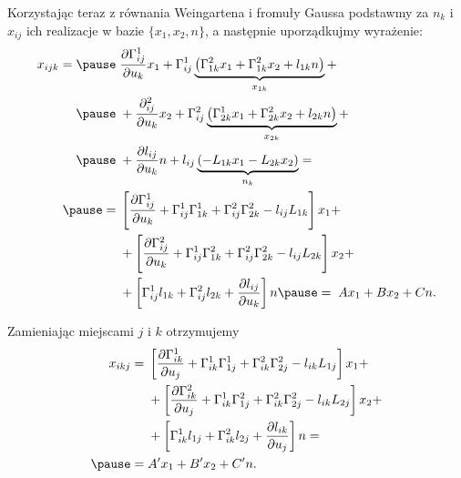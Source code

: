 \begin{frame}[<+->]

Korzystając teraz z równania Weingartena i fromuły Gaussa podstawmy za $n_k$ i $x_{ij}$ ich realizacje w bazie $\{x_1, x_2,n\}$, a następnie uporządkujmy wyrażenie:
\begin{align*}
x_{ijk}=\pause &\;\frac{\partial \Gamma^1_{ij}}{\partial u_k}x_1+ \Gamma^1_{ij}\underbrace{\left( \Gamma^2_{1k}x_1+\Gamma^2_{1k}x_2+l_{1k}n\right)}_{x_{1k}}+\\\pause
&\;+\frac{\partial^2_{ij}}{\partial u_k}x_2 +\Gamma^2_{ij}\underbrace{\left( \Gamma^1_{2k}x_1+\Gamma^2_{2k}x_2+l_{2k}n\right)}_{x_{2k}}+\\\pause
&\;+\frac{\partial l_{ij}}{\partial u_k}n+l_{ij}\underbrace{\left( -L_{1k}x_1-L_{2k}x_2\right)}_{n_k}=\\\pause
=&\;\left[\frac{\partial \Gamma^1_{ij}}{\partial u_k}+\Gamma^1_{ij}\Gamma^1_{1k}+\Gamma^2_{ij}\Gamma^2_{2k}-l_{ij}L_{1k}\right]x_1+\\
&\;+\left[ \frac{\partial \Gamma^2_{ij}}{\partial u_k}+\Gamma^1_{ij}\Gamma^2_{1k}+\Gamma^2_{ij}\Gamma^2_{2k}-l_{ij}L_{2k} \right]x_2+\\
&\;+\left[\Gamma^1_{ij}l_{1k}+\Gamma^2_{ij}l_{2k}+\frac{\partial l_{ij}}{\partial u_k}\right]n\pause
=\; Ax_1+Bx_2+Cn.
\end{align*}

\end{frame}
\begin{frame}[<+->]

Zamieniając miejscami $j$ i $k$ otrzymujemy 
\begin{align*}
x_{ikj}=&\;\left[\frac{\partial \Gamma^1_{ik}}{\partial u_j}+\Gamma^1_{ik}\Gamma^1_{1j}+\Gamma^2_{ik}\Gamma^2_{2j}-l_{ik}L_{1j}\right]x_1+\\
&\;+\left[ \frac{\partial \Gamma^2_{ik}}{\partial u_j}+\Gamma^1_{ik}\Gamma^2_{1j}+\Gamma^2_{ik}\Gamma^2_{2j}-l_{ik}L_{2j} \right]x_2+\\
&\;+\left[\Gamma^1_{ik}l_{1j}+\Gamma^2_{ik}l_{2j}+\frac{\partial l_{ik}}{\partial u_j}\right]n=\\\pause
=&\; A'x_1+B'x_2+C'n.
\end{align*}

\end{frame}
